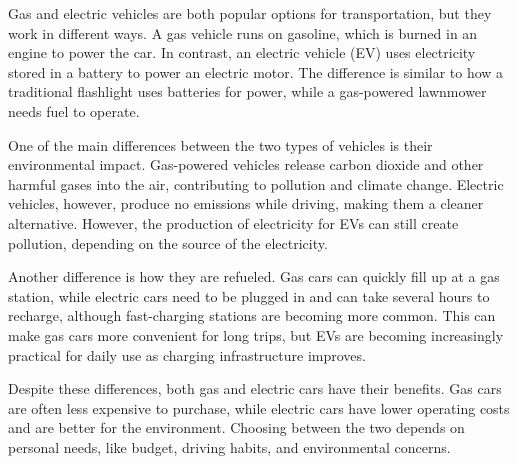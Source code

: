 \documentclass[12pt]{article}
\begin{document}
\vspace{1em}

\begin{tcolorbox}[colframe=black!60, colback=white, 
coltitle=black, colbacktitle=black!15, fonttitle=\bfseries\Large, 
title=Text: Gas and Electric Vehicles, halign title=center, left=10pt, right=10pt, top=10pt, bottom=15pt]
Gas and electric vehicles are both popular options for transportation, but they work in different ways. A gas vehicle runs on gasoline, which is burned in an engine to power the car. In contrast, an electric vehicle (EV) uses electricity stored in a battery to power an electric motor. The difference is similar to how a traditional flashlight uses batteries for power, while a gas-powered lawnmower needs fuel to operate.

One of the main differences between the two types of vehicles is their environmental impact. Gas-powered vehicles release carbon dioxide and other harmful gases into the air, contributing to pollution and climate change. Electric vehicles, however, produce no emissions while driving, making them a cleaner alternative. However, the production of electricity for EVs can still create pollution, depending on the source of the electricity.

Another difference is how they are refueled. Gas cars can quickly fill up at a gas station, while electric cars need to be plugged in and can take several hours to recharge, although fast-charging stations are becoming more common. This can make gas cars more convenient for long trips, but EVs are becoming increasingly practical for daily use as charging infrastructure improves.

Despite these differences, both gas and electric cars have their benefits. Gas cars are often less expensive to purchase, while electric cars have lower operating costs and are better for the environment. Choosing between the two depends on personal needs, like budget, driving habits, and environmental concerns.

 

 
\end{tcolorbox}

\vspace{2em}
\end{document}
